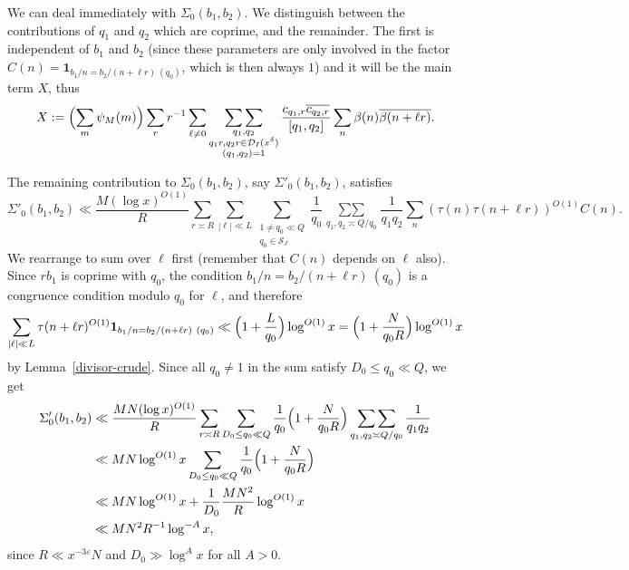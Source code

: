 \documentclass[12pt,a4paper,reqno]{amsart}
\numberwithin{equation}{section}
\theoremstyle{plain}
\theoremstyle{definition}
\newcommand\eps{\varepsilon}
\newcommand{\DIone}[2]{\mathcal{D}_{{#1}}({#2})}
\newcommand\sumsum{\mathop{\sum\sum}\limits}
\renewcommand{\sim}{\asymp}
\newcommand{\onef}{\mathbf{1}}
\begin{document}
We can deal immediately with $\Sigma_0(b_1,b_2)$. We distinguish
between the contributions of $q_1$ and $q_2$ which are coprime, and
the remainder. The first is independent of $b_1$ and $b_2$ (since
these parameters are only involved in the factor
$C(n)=\onef_{b_1/n=b_2/(n+\ell r)\ (q_0)}$, which is then always $1$)
and it will be the main term $X$, thus
$$
  X := \Bigl(\sum_m\psi_M(m)\Bigr)
  \sum_rr^{-1}\sum_{\ell\neq 0}
  \sumsum_{\substack{q_1,q_2\\q_1r,q_2r\in
      \DIone{I}{x^{\delta}} \\ (q_1,q_2)=1}} \frac{c_{q_1,r}\overline{c_{q_2,r}}}{[q_1,q_2]}\\
  \sum_n\beta(n)\overline{\beta(n+\ell r)}.
$$
\par
The remaining contribution to $\Sigma_0(b_1,b_2)$, say $\Sigma'_0(b_1,b_2)$, satisfies
$$
  \Sigma'_0(b_1,b_2)\ll \frac{M(\log x)^{O(1)}}{R} \sum_{r\sim R}
  \sum_{|\ell|\ll L} \sum_{\substack{1\neq q_0\ll Q\\ q_0 \in
      {\mathcal S}_{J}}}\frac{1}{q_0}\sumsum_{q_1,q_2 \sim Q/q_0}
  \frac{1}{q_1q_2}
  \sum_{n}(\tau(n)\tau(n+\ell r))^{O(1)}C(n).
$$
We rearrange to sum over $\ell$ first (remember that $C(n)$ depends on
$\ell$ also). Since $rb_1$ is coprime with $q_0$, the condition
$b_1/n=b_2/(n+\ell r)\ (q_0)$ is a congruence condition modulo $q_0$
for $\ell$, and therefore
$$
\sum_{|\ell|\ll L} \tau(n+\ell r)^{O(1)}\onef_{b_1/n=b_2/(n+\ell r)\
  (q_0)}\ll \Bigl(1+\frac{L}{q_0}\Bigr)\log^{O(1)} x
=\Bigl(1+\frac{N}{q_0R}\Bigr)\log^{O(1)} x
$$
by Lemma~\ref{divisor-crude}. Since all $q_0\neq 1$ in the sum satisfy
$D_0\leq q_0\ll Q$, we get
\begin{align*}
  \Sigma'_0(b_1,b_2)&\ll \frac{MN(\log x)^{O(1)}}{R} \sum_{r\sim R}
  \sum_{D_0\leq q_0\ll Q}\frac{1}{q_0}\Bigl(1+\frac{N}{q_0R}\Bigr)
  \sumsum_{q_1,q_2 \sim Q/q_0}  \frac{1}{q_1q_2}\\
  &\ll MN\log^{O(1)} x\sum_{D_0\leq q_0\ll
    Q}\frac{1}{q_0}\Bigl(1+\frac{N}{q_0R}\Bigr)\\
    &\ll MN\log^{O(1)}x +\frac{1}{D_0}\frac{MN^2}{R}\log^{O(1)} x\\
    &\ll MN^2R^{-1}\log^{-A} x,
\end{align*}
since $R\ll x^{-3\eps}N$ and $D_0\gg \log^A x$ for all $A>0$.
\end{document}
